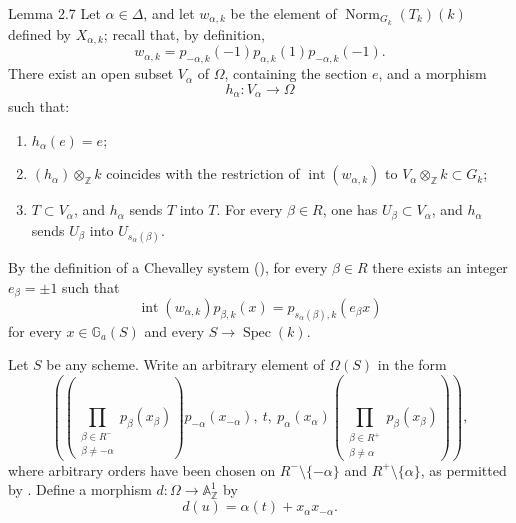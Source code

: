 \begin{sgastatement}{Lemma 2.7}
Let \(\alpha\in\Delta\), and let \(w_{\alpha,k}\) be the element of
\(\operatorname{Norm}_{G_k}(T_k)(k)\) defined by \(X_{\alpha,k}\); recall
that, by definition,
\[
 w_{\alpha,k}
 =p_{-\alpha,k}(-1)p_{\alpha,k}(1)p_{-\alpha,k}(-1).
\]
There exist an open subset \(V_\alpha\) of \(\Omega\), containing the
section \(e\), and a morphism
\[
 h_\alpha\colon V_\alpha\longrightarrow\Omega
\]
such that:
\begin{enumerate}[label=\textup{(\roman*)},leftmargin=2.2em]
\item \(h_\alpha(e)=e\);
\item \((h_\alpha)\otimes_{\mathbb Z}k\) coincides with the restriction
of \(\operatorname{int}(w_{\alpha,k})\) to
\(V_\alpha\otimes_{\mathbb Z}k\subset G_k\);
\item \(T\subset V_\alpha\), and \(h_\alpha\) sends \(T\) into \(T\).
For every \(\beta\in R\), one has \(U_\beta\subset V_\alpha\), and
\(h_\alpha\) sends \(U_\beta\) into \(U_{s_\alpha(\beta)}\).
\end{enumerate}
\end{sgastatement}

By the definition of a Chevalley system (), for every
\(\beta\in R\) there exists an integer \(e_\beta=\pm1\) such that
\[
 \operatorname{int}(w_{\alpha,k})p_{\beta,k}(x)
 =p_{s_\alpha(\beta),k}(e_\beta x)
\]
for every \(x\in\mathbb G_a(S)\) and every \(S\to\operatorname{Spec}(k)\).

Let \(S\) be any scheme. Write an arbitrary element of \(\Omega(S)\) in
the form
\[
\left(
 \left(\prod_{\substack{\beta\in R^-\\\beta\ne-\alpha}}
 p_\beta(x_\beta)\right)p_{-\alpha}(x_{-\alpha}),
 \ t,\
 p_\alpha(x_\alpha)
 \left(\prod_{\substack{\beta\in R^+\\\beta\ne\alpha}}
 p_\beta(x_\beta)\right)
\right),
\]
where arbitrary orders have been chosen on \(R^-\setminus\{-\alpha\}\)
and \(R^+\setminus\{\alpha\}\), as permitted by . Define a morphism
\(d\colon\Omega\to\mathbb A^1_{\mathbb Z}\) by
\[
 d(u)=\alpha(t)+x_\alpha x_{-\alpha}.
\]

